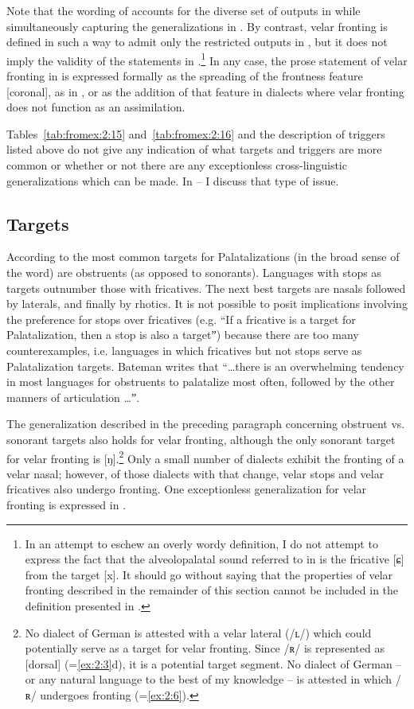 \begin{xlist}
\begin{xlist}
Note that the wording of  accounts for the diverse set of outputs in  while simultaneously capturing the generalizations in . By contrast, velar fronting is defined in such a way to admit only the restricted outputs in , but it does not imply the validity of the statements in .\footnote{{In an attempt to eschew an overly wordy definition, I do not attempt to express the fact that the alveolopalatal sound referred to in  is the fricative [ɕ] from the target [x]. It should go without saying that the properties of velar fronting described in the remainder of this section cannot be included in the definition presented in .}} In any case, the prose statement of velar fronting in  is expressed formally as the spreading of the frontness feature [coronal], as in , or as the addition of that feature in dialects where velar fronting does not function as an assimilation.

Tables~\ref{tab:fromex:2:15} and~\ref{tab:fromex:2:16} and the description of triggers listed above do not give any indication of what targets and triggers are more common or whether or not there are any exceptionless cross-linguistic generalizations which can be made. In -- I discuss that type of issue.

\subsection{Targets}\label{sec:2.3.2}

According to \citet[56ff.]{Bateman2007} the most common targets for Palatalizations (in the broad sense of the word) are obstruents (as opposed to sonorants). Languages with stops as targets outnumber those with fricatives. The next best targets are nasals followed by laterals, and finally by rhotics. It is not possible to posit implications involving the preference for stops over fricatives (e.g. “If a fricative is a target for Palatalization, then a stop is also a targetˮ) because there are too many counterexamples, i.e. languages in which fricatives but not stops serve as Palatalization targets. Bateman writes that “…there is an overwhelming tendency in most languages for obstruents to palatalize most often, followed by the other manners of articulation …ˮ.

The generalization described in the preceding paragraph concerning obstruent vs. sonorant targets also holds for velar fronting, although the only sonorant target for velar fronting is [ŋ].\footnote{{No dialect of German is attested with a velar lateral (/ʟ/) which could potentially serve as a target for velar fronting. Since /ʀ/ is represented as [dorsal] (=\ref{ex:2:3}d), it is a potential target segment. No dialect of German -- or any natural language to the best of my knowledge -- is attested in which /ʀ/ undergoes fronting (=\ref{ex:2:6}).} } Only a small number of dialects exhibit the fronting of a velar nasal; however, of those dialects with that change, velar stops and velar fricatives also undergo fronting. One exceptionless generalization for velar fronting is expressed in .


\end{xlist}
\end{xlist}
